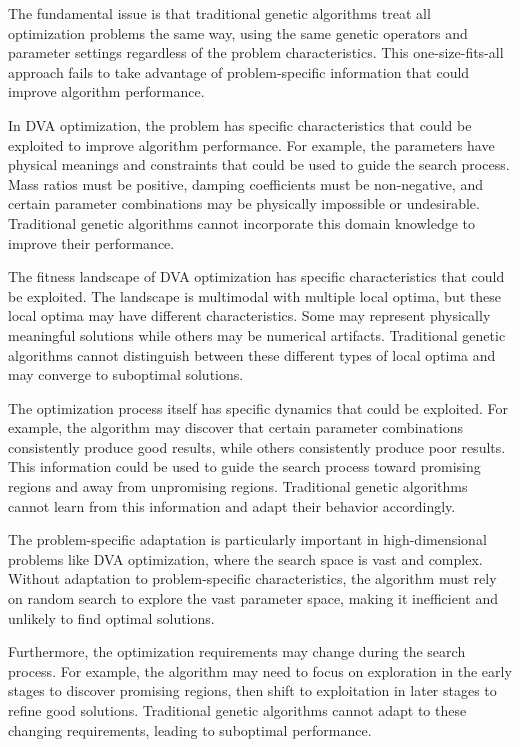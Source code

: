 \documentclass[12pt,a4paper]{article}
\begin{document}
The fundamental issue is that traditional genetic algorithms treat all optimization problems the same way, using the same genetic operators and parameter settings regardless of the problem characteristics. This one-size-fits-all approach fails to take advantage of problem-specific information that could improve algorithm performance.

In DVA optimization, the problem has specific characteristics that could be exploited to improve algorithm performance. For example, the parameters have physical meanings and constraints that could be used to guide the search process. Mass ratios must be positive, damping coefficients must be non-negative, and certain parameter combinations may be physically impossible or undesirable. Traditional genetic algorithms cannot incorporate this domain knowledge to improve their performance.

The fitness landscape of DVA optimization has specific characteristics that could be exploited. The landscape is multimodal with multiple local optima, but these local optima may have different characteristics. Some may represent physically meaningful solutions while others may be numerical artifacts. Traditional genetic algorithms cannot distinguish between these different types of local optima and may converge to suboptimal solutions.

The optimization process itself has specific dynamics that could be exploited. For example, the algorithm may discover that certain parameter combinations consistently produce good results, while others consistently produce poor results. This information could be used to guide the search process toward promising regions and away from unpromising regions. Traditional genetic algorithms cannot learn from this information and adapt their behavior accordingly.

The problem-specific adaptation is particularly important in high-dimensional problems like DVA optimization, where the search space is vast and complex. Without adaptation to problem-specific characteristics, the algorithm must rely on random search to explore the vast parameter space, making it inefficient and unlikely to find optimal solutions.

Furthermore, the optimization requirements may change during the search process. For example, the algorithm may need to focus on exploration in the early stages to discover promising regions, then shift to exploitation in later stages to refine good solutions. Traditional genetic algorithms cannot adapt to these changing requirements, leading to suboptimal performance.
\end{document}
